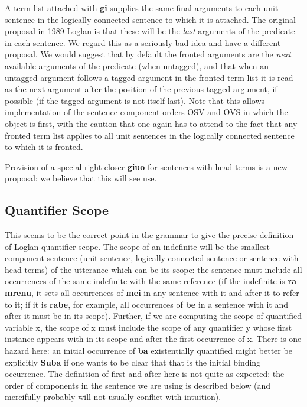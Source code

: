 \documentclass[12pt]{book}
\begin{document}
{A term list attached with {\bf gi} supplies the same final arguments to each unit sentence in the logically connected sentence to which it is attached.  The original proposal in 1989 Loglan is that these will be the {\em last\/} arguments of the predicate in each sentence.  We regard this as a seriously bad idea and have a different proposal.  We would suggest that by default the fronted arguments are the {\em next\/} available arguments of the predicate (when untagged), and that when an untagged argument follows a tagged argument in the fronted term list it is read as the next argument after the position of the previous tagged argument, if possible (if the tagged argument is not itself last).  Note that this allows implementation of the sentence component orders OSV and OVS in which the object is first, with the caution that one again has to attend to the fact that any fronted term list applies to all unit sentences in the logically connected sentence to which it is fronted.

Provision of a special right closer {\bf giuo} for sentences with head terms is a new proposal:  we believe that this will see use.

\subsection{Quantifier Scope}

This seems to be the correct point in the grammar to give the precise definition of Loglan quantifier scope.  The scope of an indefinite will be the smallest component sentence (unit sentence, logically connected sentence or sentence with head terms) of the utterance which can be its scope:  the sentence must include all occurrences of the same indefinite with the same reference (if the indefinite is {\bf ra mrenu}, it sets all occurrences of {\bf mei} in any sentence with it and after it to refer to it; if it is {\bf rabe}, for example, all occurrences of {\bf be} in a sentence with it and after it must be in its scope).  Further, if we are computing the scope of quantified variable x, the scope of x must include the scope of any quantifier y whose first instance appears with in its scope and after the first occurrence of x.  There is one hazard here:  an initial occurrence of {\bf ba} existentially quantified might better be explicitly {\bf Suba} if one wants to be clear that that is the initial binding occurrence.  The definition of first and after here is not quite as expected:  the order of components in the sentence we are using is described below (and mercifully probably will not usually conflict with intuition).

}
\end{document}
